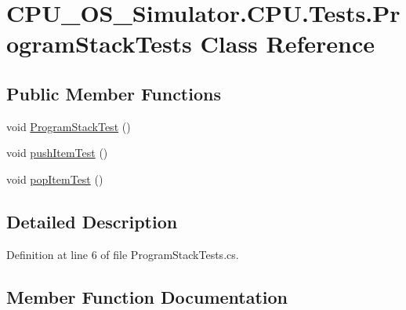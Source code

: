 \hypertarget{class_c_p_u___o_s___simulator_1_1_c_p_u_1_1_tests_1_1_program_stack_tests}{}\section{C\+P\+U\+\_\+\+O\+S\+\_\+\+Simulator.\+C\+P\+U.\+Tests.\+Program\+Stack\+Tests Class Reference}
\label{class_c_p_u___o_s___simulator_1_1_c_p_u_1_1_tests_1_1_program_stack_tests}
\subsection*{Public Member Functions}
\begin{DoxyCompactItemize}
\item 
void \hyperlink{class_c_p_u___o_s___simulator_1_1_c_p_u_1_1_tests_1_1_program_stack_tests_ae3a306f6e91d99a537f07fc4a4177c84}{Program\+Stack\+Test} ()
\item 
void \hyperlink{class_c_p_u___o_s___simulator_1_1_c_p_u_1_1_tests_1_1_program_stack_tests_aa0f5fc338f3b32423b71181218721c40}{push\+Item\+Test} ()
\item 
void \hyperlink{class_c_p_u___o_s___simulator_1_1_c_p_u_1_1_tests_1_1_program_stack_tests_ab98851c55e2cb5ce81feaae1e717b3d4}{pop\+Item\+Test} ()
\end{DoxyCompactItemize}


\subsection{Detailed Description}


Definition at line 6 of file Program\+Stack\+Tests.\+cs.



\subsection{Member Function Documentation}
\hypertarget{class_c_p_u___o_s___simulator_1_1_c_p_u_1_1_tests_1_1_program_stack_tests_ab98851c55e2cb5ce81feaae1e717b3d4}{}
